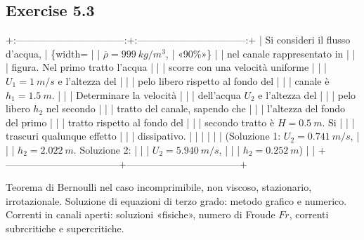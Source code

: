 \documentclass[letterpaper,10pt,italian]{jupyterBook}
\begin{document}
\subsection{Exercise 5.3}
\label{\detokenize{polimi/fluidmechanics-ita/template/capitoli/05_bernoulli/0502in:exercise-5-3}}\label{\detokenize{polimi/fluidmechanics-ita/template/capitoli/05_bernoulli/0502in:fluid-mechanics-bernoulli-ex-03}}\label{\detokenize{polimi/fluidmechanics-ita/template/capitoli/05_bernoulli/0502in::doc}}
\sphinxAtStartPar
+:———————————:+:———————————:+
| Si consideri il flusso d’acqua,   | \{width= |
| \(\overline{\rho}=999\ kg/m^3\),    | «90\%»\}                            |
| nel canale rappresentato in       |                                   |
| figura. Nel primo tratto l’acqua  |                                   |
| scorre con una velocità uniforme  |                                   |
| \(U_1 = 1\ m/s\) e l’altezza del    |                                   |
| pelo libero rispetto al fondo del |                                   |
| canale è \(h_1 = 1.5\ m\).          |                                   |
| Determinare la velocità           |                                   |
| dell’acqua \(U_2\) e l’altezza del  |                                   |
| pelo libero \(h_2\) nel secondo     |                                   |
| tratto del canale, sapendo che    |                                   |
| l’altezza del fondo del primo     |                                   |
| tratto rispetto al fondo del      |                                   |
| secondo tratto è \(H=0.5\ m\). Si   |                                   |
| trascuri qualunque effetto        |                                   |
| dissipativo.                      |                                   |
|                                   |                                   |
| (Soluzione 1: \(U_2 = 0.741\ m/s\), |                                   |
| \(h_2 = 2.022\ m\). Soluzione 2:    |                                   |
| \(U_2 = 5.940\ m/s\),               |                                   |
| \(h_2 = 0.252\ m\))                 |                                   |
+———————————–+———————————–+

\sphinxAtStartPar
Teorema di Bernoulli nel caso incomprimibile, non viscoso, stazionario,
irrotazionale. Soluzione di equazioni di terzo grado: metodo grafico e
numerico. Correnti in canali aperti: soluzioni «fisiche», numero di
Froude \(Fr\), correnti subrcritiche e supercritiche.
\end{document}
